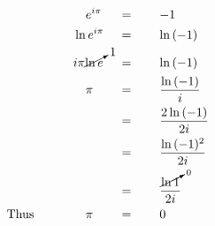 \begin{alignat*}{3}
&\,&&\,\quad e^{i\pi}&&\,=\qquad-1\\
&\,&&\,\ln{e^{i\pi}}&&\,=\qquad\ln{(-1)}\\
&\,&&\,i\pi\cancelto{1}{\ln e}&&\,=\qquad\ln{(-1)}\\
&\,&&\,\quad\pi&&\,=\qquad\frac{\ln{(-1)}}{i}\\
&\,&&\,&&\,=\qquad\frac{2\ln{(-1)}}{2i}\\
&\,&&\,&&\,=\qquad\frac{\ln{(-1)^2}}{2i}\\
&\,&&\,&&\,=\qquad\frac{\cancelto{0}{\ln{1}}}{2i}\\
&\mathrm{Thus}\qquad&&\,\quad\pi&&\,=\qquad0
\end{alignat*}
